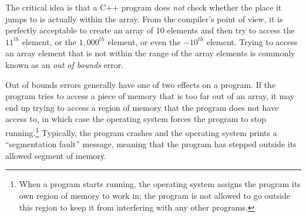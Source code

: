 The critical idea is that a C++ program does \emph{not} check whether the place it jumps to is actually within the array.  From the compiler's point of view, it is perfectly acceptable to create an array of 10 elements and then try to access the $11^{th}$ element, or the $1,000^{th}$ element, or even the $-10^{th}$ element.  Trying to access an array element that is not within the range of the array elements is commonly known as an \emph{out of bounds} error.


Out of bounds errors generally have one of two effects on a program.  If the program tries to access a piece of memory that is too far out of an array, it may end up trying to access a region of memory that the program does not have access to, in which case the operating system forces the program to stop running.\footnote{When a program starts running, the operating system assigns the program its own region of memory to work in; the program is not allowed to go outside this region to keep it from interfering with any other programs.}  Typically, the program crashes and the operating system prints a ``segmentation fault'' message, meaning that the program has stepped outside its allowed segment of memory.  


